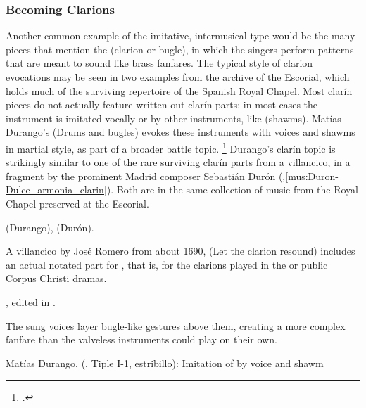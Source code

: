 \subsubsection{Becoming Clarions}

Another common example of the imitative, intermusical type would be the many
pieces that mention the  (clarion or bugle), in which the
singers perform patterns that are meant to sound like brass fanfares.
The typical style of clarion evocations may be seen in two examples from the
archive of the Escorial, which holds much of the surviving repertoire of the
Spanish Royal Chapel.
Most clarín pieces do not actually feature written-out clarín parts; in most
cases the instrument is imitated vocally or by other instruments, like
 (shawms).
Matías Durango's  (Drums and bugles) evokes these
instruments with voices and shawms in martial style, as part of a broader
battle topic.%
    \footnote{.}
Durango's clarín topic is strikingly similar to one of the rare surviving
clarín parts from a villancico, in a fragment by the prominent Madrid composer
Sebastián Durón
(,\ref{mus:Duron-Dulce_armonia_clarin}).
Both are in the same collection of music from the Royal Chapel preserved at the
Escorial.%
\begin{Footnote}
     (Durango),  (Durón).
\end{Footnote}
A villancico by José Romero from about 1690,  (Let the
clarion resound) includes an actual notated part for , that is, for the clarions played in the 
or public Corpus Christi dramas.%
\begin{Footnote} 
    , edited in \autocite[655--661]{CaberoPueyo:PhD}.
\end{Footnote}
The sung voices layer bugle-like gestures above them, creating a more complex
fanfare than the valveless instruments could play on their own.


{Matías Durango,  (, Tiple I-1,
estribillo): Imitation of  by voice and shawm}

